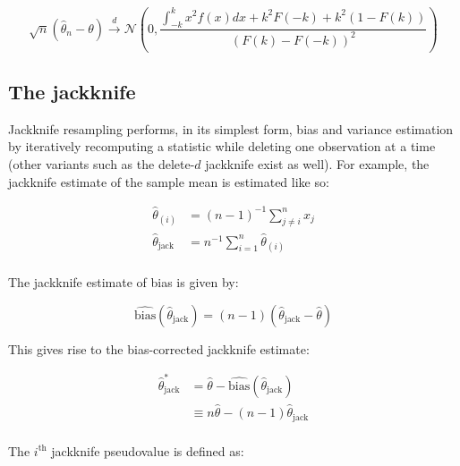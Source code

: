 \documentclass{report}
\begin{document}
\begin{equation}\label{eq:huber-estimator-asymptotics}
    \sqrt{n}\left(\hat{\theta}_n - \theta\right) \overset{d}{\to} \mathcal{N}\left(0, \frac{\int_{-k}^k x^2 f(x)dx + k^2 F(-k) + k^2 (1 - F(k))}{(F(k) - F(-k))^2}\right)
\end{equation}

\subsection{The jackknife}

Jackknife resampling performs, in its simplest form, bias and variance estimation by iteratively recomputing a statistic while deleting one observation at a time (other variants such as the delete-$d$ jackknife exist as well). For example, the jackknife estimate of the sample mean is estimated like so:

\begin{equation}\label{eq:lst-jackknife-mean}
    \begin{aligned}
      \hat{\theta}_{(i)} &= (n-1)^{-1} \sum_{j \neq i}^n x_j \\
      \hat{\theta}_{\text{jack}} &= n^{-1} \sum_{i=1}^n \hat{\theta}_{(i)} \\
    \end{aligned}
\end{equation}

The jackknife estimate of bias is given by:

\begin{equation}\label{eq:lst-jackknife-bias}
    \widehat{\text{bias}}\left(\hat{\theta}_{\text{jack}}\right) = (n-1)\left(\hat{\theta}_{\text{jack}} - \hat{\theta}\right)
\end{equation}

This gives rise to the bias-corrected jackknife estimate:

\begin{equation}\label{eq:lst-jackknife-est-bias-corrected}
    \begin{aligned}
      \hat{\theta}_{\text{jack}}^* 
        &= \hat{\theta} - \widehat{\text{bias}}\left(\hat{\theta}_{\text{jack}}\right) \\
        &\equiv n\hat{\theta} - (n-1)\hat{\theta}_{\text{jack}} \\
    \end{aligned}
\end{equation}

The $i^\text{th}$ jackknife pseudovalue is defined as:
\end{document}
